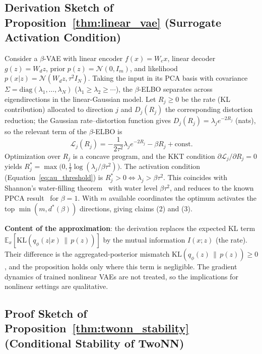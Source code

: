 \documentclass[make,article,submit,pdftex,moreauthors]{Definitions/mdpi}
\newcommand{\dstar}{d^{*}(\beta)}
\begin{document}
\subsection[\appendixname~\thesubsection]{Derivation Sketch of Proposition~\ref{thm:linear_vae} (Surrogate Activation Condition)}

Consider a $\beta$-VAE with linear encoder $f(x) = W_e x$, linear decoder
$g(z) = W_d z$, prior $p(z) = \mathcal{N}(0, I_m)$, and likelihood
$p(x|z) = \mathcal{N}(W_d z, \tau^2 I_N)$.
Taking the input in its PCA basis with covariance
$\Sigma = \mathrm{diag}(\lambda_1, \ldots, \lambda_N)$
($\lambda_1 \geq \lambda_2 \geq \cdots$), the $\beta$-ELBO separates across
eigendirections in the linear-Gaussian model.
Let $R_j \geq 0$ be the rate (KL contribution) allocated to direction $j$
and $D_j(R_j)$ the corresponding distortion reduction; the Gaussian
rate--distortion function gives $D_j(R_j) = \lambda_j e^{-2R_j}$ (nats), so
the relevant term of the $\beta$-ELBO is
\begin{equation}
  \mathcal{L}_j(R_j) = -\frac{1}{2\tau^2}\lambda_j e^{-2R_j} - \beta R_j + \text{const.}
\end{equation}
Optimization over $R_j$ is a concave program, and the KKT condition
$\partial \mathcal{L}_j / \partial R_j = 0$ yields
$R_j^* = \max\bigl(0, \tfrac{1}{2}\log(\lambda_j / \beta\tau^2)\bigr)$.
The activation condition (Equation~\eqref{eq:au_threshold}) is
$R_j^* > 0 \iff \lambda_j > \beta\tau^2$.
This coincides with Shannon's water-filling theorem~\cite{cover2006elements}
with water level $\beta\tau^2$, and reduces to the known PPCA
result~\cite{tippingbishop1999ppca} for $\beta = 1$.
With $m$ available coordinates the optimum activates the top
$\min(m, \dstar)$ directions, giving claims (2) and (3).

\textbf{Content of the approximation}: the derivation replaces the expected
KL term $\mathbb{E}_x[\mathrm{KL}(q_\phi(z|x)\,\|\,p(z))]$ by the mutual
information $I(x; z)$ (the rate).
Their difference is the aggregated-posterior mismatch
$\mathrm{KL}(q_\phi(z)\,\|\,p(z)) \geq 0$, and the proposition holds only
where this term is negligible.
The gradient dynamics of trained nonlinear VAEs are not treated, so the
implications for nonlinear settings are qualitative.

\subsection[\appendixname~\thesubsection]{Proof Sketch of Proposition~\ref{thm:twonn_stability} (Conditional Stability of TwoNN)}
\end{document}
